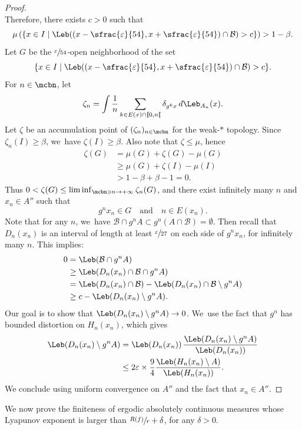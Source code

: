 \begin{proof}
\[\]
Therefore, there exists $c > 0$ such that
\[
\mu \left (\{ x \in I \mid \Leb((x - \sfrac{\varepsilon}{54}, x + \sfrac{\varepsilon}{54}) \cap \mathcal{B}) > c \} \right) > 1 - \beta.
\]
Let $G$ be the $\sfrac{\varepsilon}{54}$-open neighborhood of the set
\[
\{ x \in I \mid \Leb((x - \sfrac{\varepsilon}{54}, x + \sfrac{\varepsilon}{54}) \cap \mathcal{B}) > c \}.
\]
For $n \in \mcbn$, let
\[
\zeta_n = \int \frac{1}{n} \sum_{k \in E(x) \cap [\![ 0, n [\![} \delta_{g^k x}\, d \Leb_{A_n}(x).
\]
Let $\zeta$ be an accumulation point of $(\zeta_n)_{n \in \mcbn}$ for the weak\nobreakdash-$*$ topology.
Since $\zeta_n(I) \geq \beta$, we~have $\zeta(I) \geq \beta$.
Also note that $\zeta \leq \mu$, hence
\begin{align*}
\zeta(G) &= \mu(G) + \zeta(G) - \mu(G)\\
&\geq \mu(G) + \zeta(I) - \mu(I)\\
&> 1- \beta + \beta - 1 = 0.
\end{align*}
Thus $0 < \zeta(G) \leq \liminf_{\mcbn \ni n \to +\infty} \zeta_n(G)$, and there exist infinitely many $n$ and $x_n \in A''$ such that
\[
g^n x_n \in G \quad\text{and} \quad n \in E(x_n).
\]
Note that for any $n$, we~have $\mathcal{B} \cap g^n A \subset g^n(A \cap \mathcal{B}) = \emptyset$.
Then recall that $D_n(x_n)$ is an interval of length at least $\sfrac{\varepsilon}{27}$ on each side of $g^n x_n$, for infinitely many $n$.
This implies:
\begin{align*}
0 &= \Leb(\mathcal{B} \cap g^n A)\\
&\geq \Leb(D_n(x_n) \cap \mathcal{B} \cap g^n A)\\
&= \Leb(D_n(x_n) \cap \mathcal{B}) - \Leb(D_n(x_n) \cap \mathcal{B} \setminus g^n A)\\
&\geq c - \Leb(D_n(x_n) \setminus g^n A).
\end{align*}
Our goal is to show that $\Leb(D_n(x_n) \setminus g^n A) \to 0$. We~use the fact that $g^n$ has bounded distortion on $H_n(x_n)$, which gives
\begin{align*}
\Leb(D_n(x_n) \setminus g^n A) &= \Leb(D_n(x_n))\, \frac{\Leb(D_n(x_n) \setminus g^n A)}{\Leb(D_n(x_n))}\\
&\leq 2 \varepsilon \times \frac{9}{4} \frac{\Leb(H_n(x_n) \setminus A)}{\Leb(H_n(x_n))}.
\end{align*}
We conclude using uniform convergence on $A''$ and the fact that $x_n \in A''$.
\end{proof}

We now prove the finiteness of ergodic absolutely continuous measures whose Lyapunov exponent is larger than $\sfrac{R(f)}{r} + \delta$, for any $\delta > 0$.

